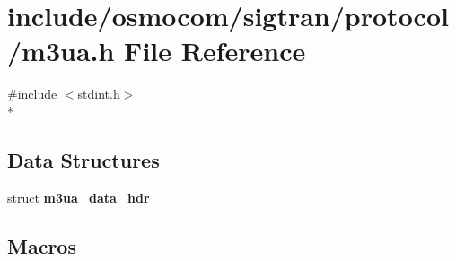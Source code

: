 \section{include/osmocom/sigtran/protocol/m3ua.h File Reference}
\label{m3ua_8h}
{\ttfamily \#include $<$stdint.\+h$>$}\\*
\subsection*{Data Structures}
\begin{DoxyCompactItemize}
\item 
struct {\bf m3ua\+\_\+data\+\_\+hdr}
\end{DoxyCompactItemize}
\subsection*{Macros}
